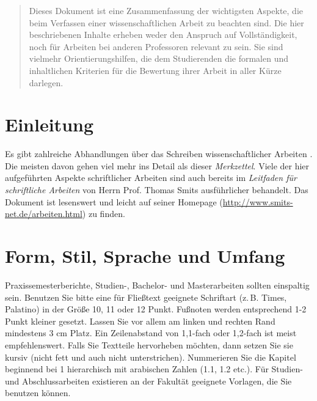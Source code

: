 \documentclass[conference,final,a4paper]{IEEEtran}
\begin{document}




\maketitle

\begin{abstract}
Dieses Dokument ist eine Zusammenfassung der wichtigsten Aspekte, die beim Verfassen einer wissenschaftlichen Arbeit zu beachten sind. Die hier beschriebenen Inhalte erheben weder den Anspruch auf Vollständigkeit, noch für Arbeiten bei anderen Professoren relevant zu sein. Sie sind vielmehr Orientierungshilfen, die dem Studierenden die formalen und inhaltlichen Kriterien für die Bewertung ihrer Arbeit in aller Kürze darlegen. 
\end{abstract}





%
\IEEEpeerreviewmaketitle



\section{Einleitung}

Es gibt zahlreiche Abhandlungen über das Schreiben wissenschaftlicher Arbeiten \cite{kraemer, kornmeier, stengel, kara, eco}. Die meisten davon gehen viel mehr ins Detail als dieser \emph{Merkzettel}. Viele der hier aufgeführten Aspekte schriftlicher Arbeiten sind auch bereits im \emph{Leitfaden für schriftliche Arbeiten} von Herrn Prof. Thomas Smits ausführlicher behandelt. Das Dokument ist lesenswert und leicht auf seiner Homepage (\url{http://www.smits-net.de/arbeiten.html}) zu finden.

\section{Form, Stil, Sprache und Umfang}
Praxissemesterberichte, Studien-, Bachelor- und Masterarbeiten sollten einspaltig sein. Benutzen Sie bitte eine für Fließtext geeignete Schriftart (z.\,B. Times, Palatino) in der Größe 10, 11 oder 12 Punkt. Fußnoten werden entsprechend 1-2 Punkt kleiner gesetzt. Lassen Sie vor allem am linken und rechten Rand mindestens 3 cm Platz. Ein Zeilenabstand von 1,1-fach oder 1,2-fach ist meist empfehlenswert. Falls Sie Textteile hervorheben möchten, dann setzen Sie sie kursiv (nicht fett und auch nicht unterstrichen). Nummerieren Sie die Kapitel beginnend bei 1 hierarchisch mit arabischen Zahlen (1.1, 1.2 etc.). Für Studien- und Abschlussarbeiten existieren an der Fakultät geeignete Vorlagen, die Sie benutzen können.
\end{document}
